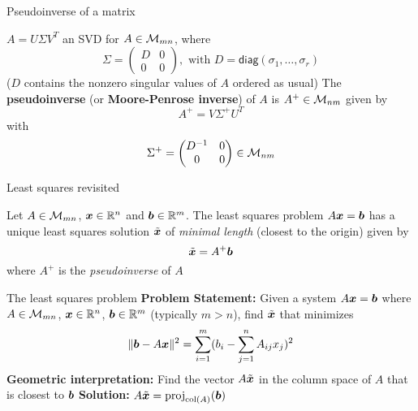 \documentclass[aspectratio=169]{beamer}\usepackage[]{graphicx}\usepackage[]{xcolor}
\begin{document}
\begin{frame}{Pseudoinverse of a matrix}
\begin{definition}[Pseudoinverse]
$A=U\Sigma V^T$ an SVD for $A\in\mathcal{M}_{mn}$, where 
\[
\Sigma = \begin{pmatrix}
D & 0 \\ 0 & 0
\end{pmatrix},
\textrm{ with }
D=\mathsf{diag}(\sigma_1,\ldots,\sigma_r)
\]
($D$ contains the nonzero singular values of $A$ ordered as usual)
\vskip0.5cm
The \textbf{pseudoinverse} (or \textbf{Moore-Penrose inverse}) of $A$ is $A^+\in\mathcal{M}_{nm}$ given by
\[
A^+ = V\Sigma^+ U^T
\]
with
\[
\Sigma^+ =
\begin{pmatrix}
D^{-1} & 0 \\ 0 & 0
\end{pmatrix}\in\mathcal{M}_{nm}
\]
\end{definition}
\end{frame}



\begin{frame}{Least squares revisited}
\begin{theorem}
Let $A\in\mathcal{M}_{mn}$, $\bm{x}\in\mathbb{R}^n$ and $\bm{b}\in\mathbb{R}^m$. The least squares problem $A\bm{x}=\bm{b}$ has a unique least squares solution $\tilde{\bm{x}}$ of \emph{minimal length} (closest to the origin) given by
\[
\tilde{\bm{x}} = A^+\bm{b}
\]
where $A^+$ is the \emph{pseudoinverse} of $A$
\end{theorem}
\end{frame}





\begin{frame}{The least squares problem}
\textbf{Problem Statement:}
\vfill
Given a system $A\bm{x} = \bm{b}$ where $A\in\mathcal{M}_{mn}$, $\bm{x}\in\mathbb{R}^n$, $\bm{b}\in\mathbb{R}^m$ (typically $m>n$), find $\tilde{\bm{x}}$ that minimizes
$$
\|\bm{b} - A\bm{x}\|^2 = \sum_{i=1}^m (b_i - \sum_{j=1}^n A_{ij}x_j)^2
$$
\vfill
\textbf{Geometric interpretation:}
Find the vector $A\tilde{\bm{x}}$ in the column space of $A$ that is closest to $\bm{b}$
\vfill
\textbf{Solution:} $A\tilde{\bm{x}} = \text{proj}_{\text{col}(A)}(\bm{b})$
\end{frame}
\end{document}
